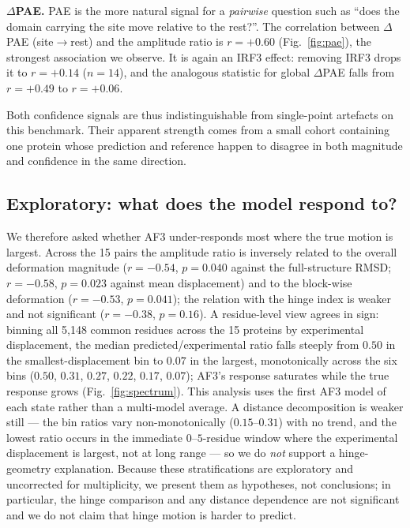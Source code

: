 \noindent\textbf{$\Delta$PAE.} PAE is the more natural signal for a
\emph{pairwise} question such as ``does the domain carrying the site move
relative to the rest?''. The correlation between $\Delta$PAE
(site$\rightarrow$rest) and the amplitude ratio is $r=+0.60$
(Fig.~\ref{fig:pae}), the strongest association we observe. It is again an
IRF3 effect: removing IRF3 drops it to $r=+0.14$ ($n=14$), and the
analogous statistic for global $\Delta$PAE falls from $r=+0.49$ to
$r=+0.06$.

Both confidence signals are thus indistinguishable from single-point
artefacts on this benchmark. Their apparent strength comes from a small
cohort containing one protein whose prediction and reference happen
to disagree in both magnitude and confidence in the same direction.

\subsection{Exploratory: what does the model respond to?}
\label{sec:res-explore}

We therefore asked whether AF3 under-responds most where the true motion
is largest. Across the 15 pairs the amplitude ratio
is inversely related to the overall deformation magnitude
($r=-0.54$, $p=0.040$ against the full-structure RMSD; $r=-0.58$,
$p=0.023$ against mean displacement) and to the block-wise deformation
($r=-0.53$, $p=0.041$); the relation with the hinge index is weaker and
not significant ($r=-0.38$, $p=0.16$). A residue-level view agrees in
sign: binning all 5{,}148 common residues across the 15 proteins by
experimental displacement, the median predicted/experimental ratio falls
steeply from $0.50$ in the smallest-displacement bin to $0.07$ in the
largest, monotonically across the six bins ($0.50$, $0.31$, $0.27$,
$0.22$, $0.17$, $0.07$); AF3's response
saturates while the true response grows (Fig.~\ref{fig:spectrum}). This
analysis uses the first AF3 model of each state rather than a multi-model
average. A distance decomposition is
weaker still --- the
bin ratios vary non-monotonically ($0.15$--$0.31$) with no trend, and the
lowest ratio occurs in the immediate $0$--$5$-residue window where the
experimental displacement is largest, not at long range --- so we do
\emph{not} support a hinge-geometry explanation. Because these
stratifications are exploratory and uncorrected for multiplicity, we
present them as hypotheses, not conclusions; in particular, the hinge
comparison and any distance dependence are not significant and we do not
claim that hinge motion is
harder to predict.

